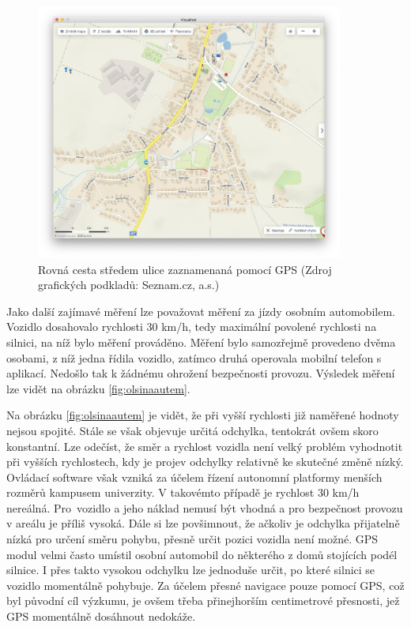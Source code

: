 \documentclass[czech, bachelor]{diploma}
\begin{document}
\begin{figure}
    \centering
    \includegraphics[width=0.9\textwidth]{Figures/louky.png}
    \caption{Rovná cesta středem ulice zaznamenaná pomocí GPS (Zdroj grafických podkladů: Seznam.cz, a.s.)}
    \label{fig:louky}
\end{figure}

Jako další zajímavé měření lze považovat měření za jízdy osobním automobilem. Vozidlo dosahovalo rychlosti 30 km/h, tedy maximální
povolené rychlosti na silnici, na níž bylo měření prováděno. Měření bylo samozřejmě provedeno dvěma osobami, z níž jedna řídila
vozidlo, zatímco druhá operovala mobilní telefon s aplikací. Nedošlo tak k žádnému ohrožení bezpečnosti provozu. Výsledek měření
lze vidět na obrázku \ref{fig:olsinaautem}.

Na obrázku \ref{fig:olsinaautem} je vidět, že při vyšší rychlosti již naměřené hodnoty nejsou spojité. Stále se však objevuje
určitá odchylka, tentokrát ovšem skoro konstantní. Lze odečíst, že směr a rychlost vozidla není velký problém vyhodnotit při
vyšších rychlostech, kdy je projev odchylky relativně ke skutečné změně nízký. Ovládací software však vzniká za účelem řízení
autonomní platformy menších rozměrů kampusem univerzity. V takovémto případě je rychlost 30 km/h nereálná. Pro~vozidlo a jeho
náklad nemusí být vhodná a pro bezpečnost provozu v areálu je příliš vysoká. Dále si lze povšimnout, že ačkoliv je odchylka
přijatelně nízká pro určení směru pohybu, přesně určit pozici vozidla není možné. GPS modul velmi často umístil osobní automobil
do některého z domů stojících podél silnice. I přes takto vysokou odchylku lze jednoduše určit, po které silnici se vozidlo
momentálně pohybuje. Za účelem přesné navigace pouze pomocí GPS, což byl původní cíl výzkumu, je ovšem třeba přinejhorším
centimetrové přesnosti, jež GPS momentálně dosáhnout nedokáže.
\end{document}
